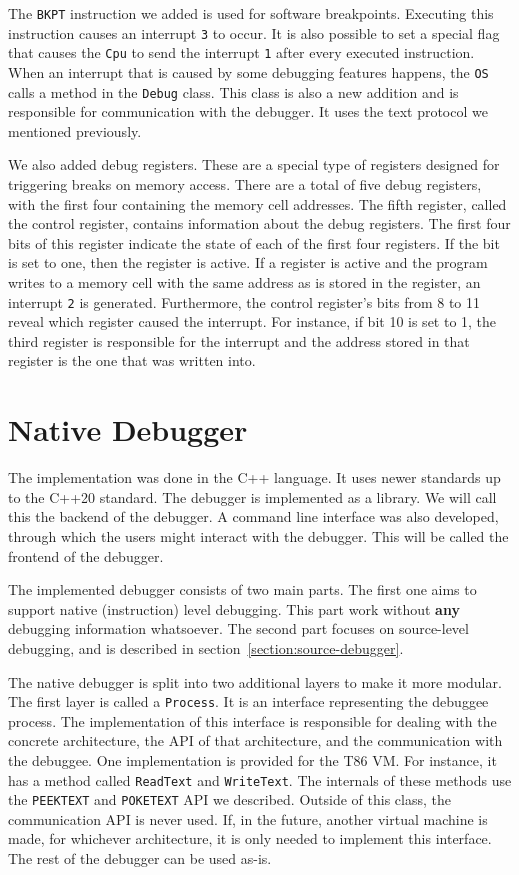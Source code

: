 The \texttt{BKPT} instruction we added is used for software breakpoints.
Executing this instruction causes an interrupt \texttt{3} to occur. It is also
possible to set a special flag that causes the \texttt{Cpu} to send the
interrupt \texttt{1} after every executed instruction. When an interrupt that
is caused by some debugging features happens, the \texttt{OS} calls a method
in the \texttt{Debug} class. This class is also a new addition and is
responsible for communication with the debugger. It uses the text protocol we
mentioned previously.

We also added debug registers. These are a special type of registers designed
for triggering breaks on memory access. There are a total of five debug
registers, with the first four containing the memory cell addresses. The fifth
register, called the control register, contains information about the debug
registers. The first four bits of this register indicate the state of each of
the first four registers. If the bit is set to one, then the register is
active. If a register is active and the program writes to a memory cell with
the same address as is stored in the register, an interrupt \texttt{2} is
generated. Furthermore, the control register's bits from 8 to 11 reveal which
register caused the interrupt. For instance, if bit 10 is set to 1, the third
register is responsible for the interrupt and the address stored in that
register is the one that was written into.

\section{Native Debugger}
The implementation was done in the C++ language. It uses newer standards up to
the C++20 standard. The debugger is implemented as a library. We will call this
the backend of the debugger. A command line interface was also developed,
through which the users might interact with the debugger. This will be called
the frontend of the debugger.

The implemented debugger consists of two main parts. The first one aims to
support native (instruction) level debugging. This part work without
\textbf{any} debugging information whatsoever. The second part focuses on
source-level debugging, and is described in
section~\ref{section:source-debugger}.

The native debugger is split into two additional layers to make it more
modular. The first layer is called a \texttt{Process}. It is an interface
representing the debuggee process. The implementation of this interface is
responsible for dealing with the concrete architecture, the API of that
architecture, and the communication with the debuggee. One implementation is
provided for the T86 VM. For instance, it has a method called \texttt{ReadText}
and \texttt{WriteText}. The internals of these methods use the
\texttt{PEEKTEXT} and \texttt{POKETEXT} API we described. Outside of this
class, the communication API is never used. If, in the future, another virtual
machine is made, for whichever architecture, it is only needed to implement
this interface. The rest of the debugger can be used as-is.

